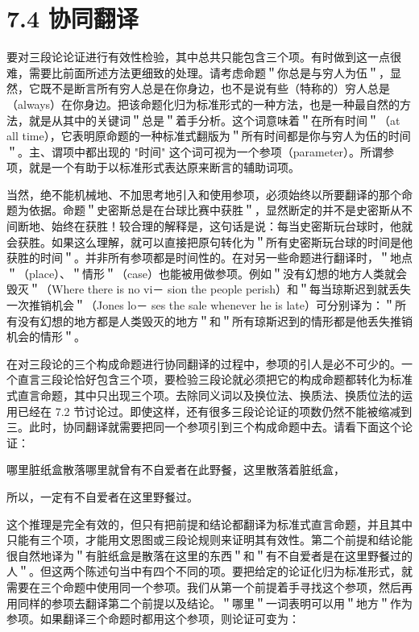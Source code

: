 \section*{7.4 协同翻译}
要对三段论论证进行有效性检验，其中总共只能包含三个项。有时做到这一点很难，需要比前面所述方法更细致的处理。请考虑命题＂你总是与穷人为伍＂，显然，它既不是断言所有穷人总是在你身边，也不是说有些（特称的）穷人总是（always）在你身边。把该命题化归为标准形式的一种方法，也是一种最自然的方法，就是从其中的关键词＂总是＂着手分析。这个词意味着＂在所有时间＂（at all time），它表明原命题的一种标准式翻版为＂所有时间都是你与穷人为伍的时间＂。主、谓项中都出现的 "时间" 这个词可视为一个参项（parameter）。所谓参项，就是一个有助于以标准形式表达原来断言的辅助词项。

当然，绝不能机械地、不加思考地引入和使用参项，必须始终以所要翻译的那个命题为依据。命题＂史密斯总是在台球比赛中获胜＂，显然断定的并不是史密斯从不间断地、始终在获胜！较合理的解释是，这句话是说：每当史密斯玩台球时，他就会获胜。如果这么理解，就可以直接把原句转化为＂所有史密斯玩台球的时间是他获胜的时间＂。并非所有参项都是时间性的。在对另一些命题进行翻译时，＂地点＂（place）、＂情形＂（case）也能被用做参项。例如＂没有幻想的地方人类就会毁灭＂（Where there is no vi－ sion the people perish）和＂每当琼斯迟到就丢失一次推销机会＂（Jones lo－ ses the sale whenever he is late）可分别译为：＂所有没有幻想的地方都是人类毁灭的地方＂和＂所有琼斯迟到的情形都是他丢失推销机会的情形＂。

在对三段论的三个构成命题进行协同翻译的过程中，参项的引人是必不可少的。一个直言三段论恰好包含三个项，要检验三段论就必须把它的构成命题都转化为标准式直言命题，其中只出现三个项。去除同义词以及换位法、换质法、换质位法的运用已经在 7.2 节讨论过。即使这样，还有很多三段论论证的项数仍然不能被缩减到三。此时，协同翻译就需要把同一个参项引到三个构成命题中去。请看下面这个论证：

\begin{displayquote}
哪里脏纸盒散落哪里就曾有不自爱者在此野餐，这里散落着脏纸盒，
\end{displayquote}

所以，一定有不自爱者在这里野餐过。

这个推理是完全有效的，但只有把前提和结论都翻译为标准式直言命题，并且其中只能有三个项，才能用文恩图或三段论规则来证明其有效性。第二个前提和结论能很自然地译为＂有脏纸盒是散落在这里的东西＂和＂有不自爱者是在这里野餐过的人＂。但这两个陈述句当中有四个不同的项。要把给定的论证化归为标准形式，就需要在三个命题中使用同一个参项。我们从第一个前提着手寻找这个参项，然后再用同样的参项去翻译第二个前提以及结论。＂哪里＂一词表明可以用＂地方＂作为参项。如果翻译三个命题时都用这个参项，则论证可变为：

